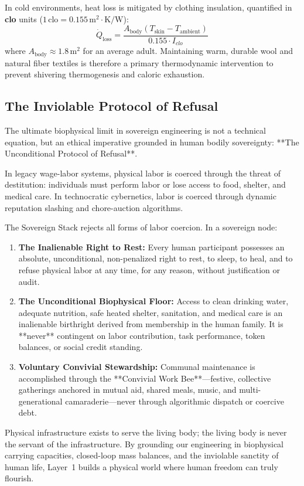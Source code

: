In cold environments, heat loss is mitigated by clothing insulation, quantified in \textbf{clo} units ($1\,\mathrm{clo} = 0.155\,\mathrm{m^2\cdot K/W}$):
\begin{equation}
\dot{Q}_{\mathrm{loss}} = \frac{A_{\mathrm{body}} (T_{\mathrm{skin}} - T_{\mathrm{ambient}})}{0.155 \cdot I_{clo}}
\label{eq:clo_heat_loss}
\end{equation}
where $A_{\mathrm{body}} \approx 1.8\,\mathrm{m^2}$ for an average adult. Maintaining warm, durable wool and natural fiber textiles is therefore a primary thermodynamic intervention to prevent shivering thermogenesis and caloric exhaustion.

\subsection{The Inviolable Protocol of Refusal}

The ultimate biophysical limit in sovereign engineering is not a technical equation, but an ethical imperative grounded in human bodily sovereignty: **The Unconditional Protocol of Refusal**.

In legacy wage-labor systems, physical labor is coerced through the threat of destitution: individuals must perform labor or lose access to food, shelter, and medical care. In technocratic cybernetics, labor is coerced through dynamic reputation slashing and chore-auction algorithms.

The Sovereign Stack rejects all forms of labor coercion. In a sovereign node:
\begin{enumerate}
    \item \textbf{The Inalienable Right to Rest:} Every human participant possesses an absolute, unconditional, non-penalized right to rest, to sleep, to heal, and to refuse physical labor at any time, for any reason, without justification or audit.
    \item \textbf{The Unconditional Biophysical Floor:} Access to clean drinking water, adequate nutrition, safe heated shelter, sanitation, and medical care is an inalienable birthright derived from membership in the human family. It is **never** contingent on labor contribution, task performance, token balances, or social credit standing.
    \item \textbf{Voluntary Convivial Stewardship:} Communal maintenance is accomplished through the **Convivial Work Bee**---festive, collective gatherings anchored in mutual aid, shared meals, music, and multi-generational camaraderie---never through algorithmic dispatch or coercive debt.
\end{enumerate}

Physical infrastructure exists to serve the living body; the living body is never the servant of the infrastructure. By grounding our engineering in biophysical carrying capacities, closed-loop mass balances, and the inviolable sanctity of human life, Layer~1 builds a physical world where human freedom can truly flourish.
